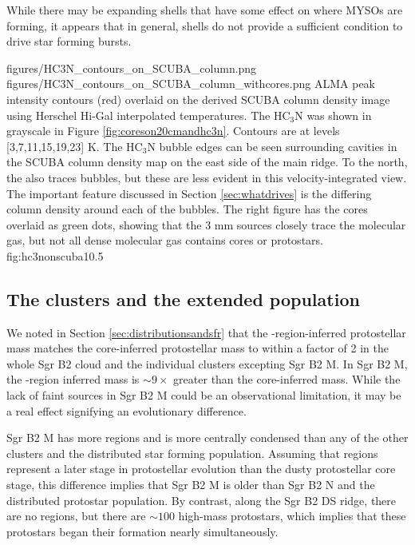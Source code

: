 \documentclass[twocolumn]{aastex61}
\begin{document}

While there may be expanding shells that have some effect on where MYSOs are
forming, it appears that in general, shells do not provide a sufficient
condition to drive star forming bursts.


\FigureTwo
{figures/HC3N_contours_on_SCUBA_column.png}
{figures/HC3N_contours_on_SCUBA_column_withcores.png}
{ALMA \cyanoacetylene peak intensity contours (red) overlaid on the derived SCUBA
column density
image using Herschel Hi-Gal interpolated temperatures. The HC$_3$N was
shown in grayscale in Figure \ref{fig:coreson20cmandhc3n}.
Contours are at levels [3,7,11,15,19,23] K.  The  HC$_3$N bubble edges can be
seen surrounding cavities in the SCUBA column density map on the east side of
the main ridge.  To the north, the \cyanoacetylene also traces bubbles, but these are
less evident in this velocity-integrated view.  The important feature discussed
in Section \ref{sec:whatdrives} is the differing column density around each of
the bubbles.  The right figure has the cores overlaid as green dots,
showing that the 3 mm sources closely trace the molecular gas, but not all
dense molecular gas contains cores or protostars.}
{fig:hc3nonscuba}{1}{0.5\textwidth}

\subsection{The clusters and the extended population}
\label{sec:clustersandextended}
We noted in Section \ref{sec:distributionsandsfr} that the \hii-region-inferred
protostellar mass matches the core-inferred protostellar mass to within a
factor of 2 in the whole Sgr B2 cloud and the individual clusters excepting Sgr
B2 M.  In Sgr B2 M, the \hii-region inferred mass is $\sim9\times$ greater than
the core-inferred mass.  While the lack of faint sources in Sgr B2 M could
be an observational limitation, it may be a real effect signifying an evolutionary
difference.

Sgr B2 M has more \hii regions and is more centrally condensed than any of the
other clusters and the distributed star forming population.  Assuming that \hii
regions represent a later stage in protostellar evolution than the dusty
protostellar core stage, this difference implies that Sgr B2 M is older than
Sgr B2 N and the distributed protostar population.  By contrast, along the Sgr
B2 DS ridge, there are no \hii regions, but there are $\sim100$ high-mass
protostars, which implies that these protostars began their formation nearly
simultaneously.
\end{document}
